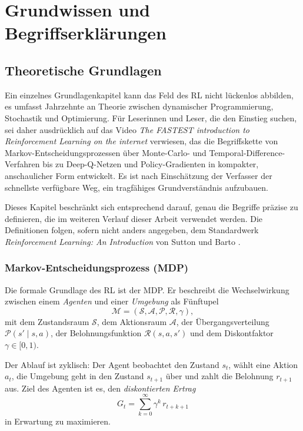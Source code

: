 \chapter{Grundwissen und Begriffserklärungen}
\label{chap:grundlagen}

\section{Theoretische Grundlagen}
\label{sec:theorie}

Ein einzelnes Grundlagenkapitel kann das Feld des \acf{RL} nicht lückenlos abbilden, es umfasst Jahrzehnte an Theorie zwischen dynamischer Programmierung, Stochastik und Optimierung. Für Leserinnen und Leser, die den Einstieg suchen, sei daher ausdrücklich auf das Video \textit{The FASTEST introduction to Reinforcement Learning on the internet} \cite{rlintrovideo} verwiesen, das die Begriffskette von Markov-Entscheidungsprozessen über Monte-Carlo- und Temporal-Difference-Verfahren bis zu Deep-Q-Netzen und Policy-Gradienten in kompakter, anschaulicher Form entwickelt. Es ist nach Einschätzung der Verfasser der schnellste verfügbare Weg, ein tragfähiges Grundverständnis aufzubauen.

Dieses Kapitel beschränkt sich entsprechend darauf, genau die Begriffe präzise zu definieren, die im weiteren Verlauf dieser Arbeit verwendet werden. Die Definitionen folgen, sofern nicht anders angegeben, dem Standardwerk \textit{Reinforcement Learning: An Introduction} von Sutton und Barto \cite{sutton2018reinforcement}.

\subsection{Markov-Entscheidungsprozess (MDP)}
\label{subsec:mdp}

Die formale Grundlage des \ac{RL} ist der \acf{MDP}. Er beschreibt die Wechselwirkung zwischen einem \emph{Agenten} und einer \emph{Umgebung} als Fünftupel
\begin{equation}
  \mathcal{M} = (\mathcal{S}, \mathcal{A}, \mathcal{P}, \mathcal{R}, \gamma),
  \label{eq:mdp}
\end{equation}
mit dem Zustandsraum $\mathcal{S}$, dem Aktionsraum $\mathcal{A}$, der Übergangsverteilung $\mathcal{P}(s' \mid s, a)$, der Belohnungsfunktion $\mathcal{R}(s, a, s')$ und dem Diskontfaktor $\gamma \in [0,1)$.

Der Ablauf ist zyklisch: Der Agent beobachtet den Zustand $s_t$, wählt eine Aktion $a_t$, die Umgebung geht in den Zustand $s_{t+1}$ über und zahlt die Belohnung $r_{t+1}$ aus. Ziel des Agenten ist es, den \emph{diskontierten Ertrag}
\begin{equation}
  G_t = \sum_{k=0}^{\infty} \gamma^k\, r_{t+k+1}
  \label{eq:return}
\end{equation}
in Erwartung zu maximieren.

